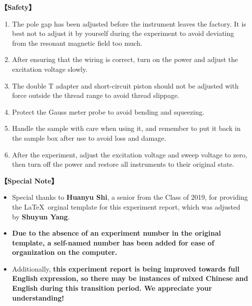 \textbf{【Safety】}	
\begin{enumerate}
	\item The pole gap has been adjusted before the instrument leaves the factory. It is best not to adjust it by yourself during the experiment to avoid deviating from the resonant magnetic field too much.
	\item After ensuring that the wiring is correct, turn on the power and adjust the excitation voltage slowly.
	\item The double T adapter and short-circuit piston should not be adjusted with force outside the thread range to avoid thread slippage.
	\item Protect the Gauss meter probe to avoid bending and squeezing.
	\item Handle the sample with care when using it, and remember to put it back in the sample box after use to avoid loss and damage.
	\item After the experiment, adjust the excitation voltage and sweep voltage to zero, then turn off the power and restore all instruments to their original state.
\end{enumerate}	
	
	
\textbf{【Special Note】}	
\begin{itemize}
	\item Special thanks to \textbf{Huanyu Shi}, a senior from the Class of 2019, for providing the \LaTeX \ orginal template for this experiment report, which was adjusted by \textbf{Shuyun Yang}. 
	
	\item \textbf{Due to the absence of an experiment number in the original template, a self-named number has been added for ease of organization on the computer.} 
	
	\item Additionally, \textcolor{fred}{\large\textbf{this experiment report is being improved towards full English expression, so there may be instances of mixed Chinese and English during this transition period. We appreciate your understanding!}}
\end{itemize}
	

\clearpage
\tableofcontents		